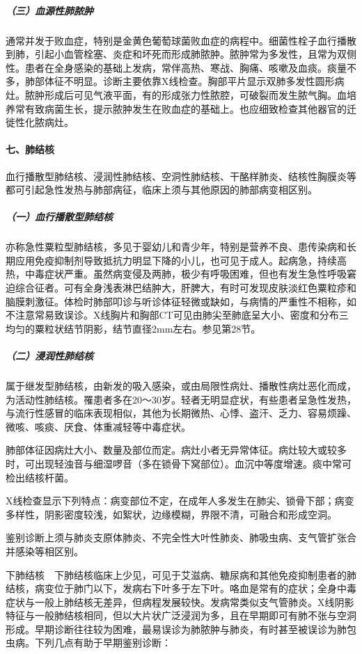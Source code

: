 \subparagraph{（三）血源性肺脓肿}

通常并发于败血症，特别是金黄色葡萄球菌败血症的病程中。细菌性栓子血行播散到肺，引起小血管栓塞、炎症和坏死而形成肺脓肿。脓肿常为多发性，且常为双侧性。患者在全身感染的基础上发病，常伴高热、寒战、胸痛、咳嗽及血痰。痰量不多，肺部体征不明显。诊断主要依靠X线检查。胸部平片显示双肺多发性圆形病灶。脓肿形成后可见气液平面，有的形成张力性脓腔，可破裂而发生脓气胸。血培养常有致病菌生长，提示脓肿发生在败血症的基础上。也应细致检查其他器官的迁徙性化脓病灶。

\paragraph{七、肺结核}

血行播散型肺结核、浸润性肺结核、空洞性肺结核、干酪样肺炎、结核性胸膜炎等都可引起急性发热与肺部病征，临床上须与其他原因的肺部病变相区别。

\subparagraph{（一）血行播散型肺结核}

亦称急性粟粒型肺结核，多见于婴幼儿和青少年，特别是营养不良、患传染病和长期应用免疫抑制剂导致抵抗力明显下降的小儿，也可见于成人。起病急，持续高热，中毒症状严重。虽然病变侵及两肺，极少有呼吸困难，但也有发生急性呼吸窘迫综合征者。可有全身浅表淋巴结肿大，肝脾大，有时可发现皮肤淡红色粟粒疹和脑膜刺激征。体检时肺部叩诊与听诊体征轻微或缺如，与病情的严重性不相称，如不注意常易致误诊。X线胸片和胸部CT可见由肺尖至肺底呈大小、密度和分布三均匀的粟粒状结节阴影，结节直径2mm左右。参见第28节。

\subparagraph{（二）浸润性肺结核}

属于继发型肺结核，由新发的吸入感染，或由局限性病灶、播散性病灶恶化而成，为活动性肺结核。罹患者多在20～30岁。轻者无明显症状，有些患者呈急性发热，与流行性感冒的临床表现相似，其他为长期微热、心悸、盗汗、乏力、容易烦躁、微咳、咳痰、厌食、体重减轻等中毒症状。

肺部体征因病灶大小、数量及部位而定。病灶小者无异常体征。病灶较大或较多时，可出现轻浊音与细湿啰音（多在锁骨下窝部位）。血沉中等度增速。痰中常可检出结核杆菌。

X线检查显示下列特点：病变部位不定，在成年人多发生在肺尖、锁骨下部；病变多样性，阴影密度较浅，如絮状，边缘模糊，界限不清，可融合和形成空洞。

鉴别诊断上须与肺炎支原体肺炎、不完全性大叶性肺炎、肺吸虫病、支气管扩张合并感染等相区别。

下肺结核　下肺结核临床上少见，可见于艾滋病、糖尿病和其他免疫抑制患者的肺结核，病变位于肺门以下，发病右下叶多于左下叶。咯血是常有的症状；全身中毒症状与一般上肺结核无差异，但病程发展较快。发病常类似支气管肺炎。X线阴影特征与一般肺结核相同，但以大片状广泛浸润为多，且在早期即可有肺不张与空洞形成。早期诊断往往较为困难，最易误诊为肺脓肿与肺炎，有时甚至被误诊为肺包虫病。下列几点有助于早期鉴别诊断：

